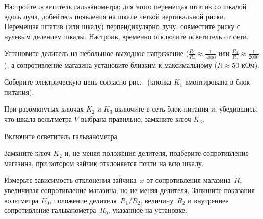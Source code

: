 \begin{lab:task}



	\item Настройте осветитель гальванометра: для этого перемещая штатив со
шкалой вдоль луча, добейтесь появления на шкале чёткой вертикальной
риски. Перемещая штатив (или шкалу) перпендикулярно лучу, совместите
риску с нулевым делением шкалы. Настроив, временно отключите осветитель
от сети.

	\item Установите делитель на небольшое выходное напряжение 
    ($\frac{R_1}{R_2} \approx \frac{1}{5000}$ 
    или $\frac{R_1}{R_2} \approx \frac{1}{2000}$), 
    а сопротивление магазина установите близким к максимальному ($R \approx 50$ кОм).

	\item Соберите электрическую цепь согласно рис.~
    (кнопка $K_1$ вмонтирована в блок питания).

	\item При разомкнутых ключах $K_2$ и
$K_3$ включите в сеть блок питания и, убедившись,
что шкала вольтметра $V$ выбрана правильно, замкните ключ
$K_3$.

	\item Включите осветитель гальванометра.

	\item Замкните ключ $K_2$ и, не меняя положения
делителя, подберите сопротивление магазина, при котором зайчик
отклоняется почти на всю шкалу.


	\item Измерьте зависимость отклонения зайчика~$x$ от сопротивления
магазина~$R$, увеличивая сопротивление магазина, но не меняя
делителя. Запишите показания вольтметра~$U_0$,
положение делителя~$R_1/R_2$, величину~$R_2$ и внутреннее сопротивление
гальванометра~$R_0$, указанное на установке.



\end{lab:task}
